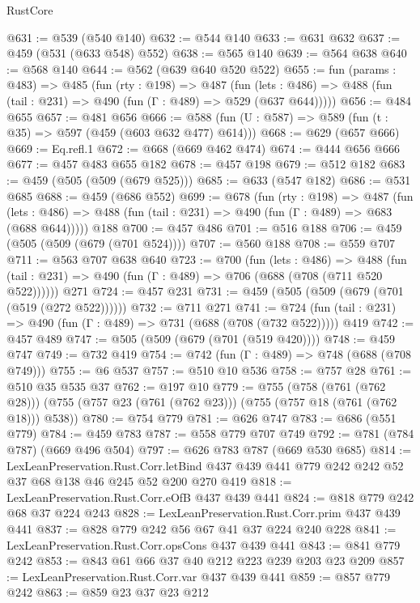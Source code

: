 \begin{lexlean}{RustCore}
\begin{coremodule}
@631 := @539 (@540 @140)
@632 := @544 @140
@633 := @631 @632
@637 := @459 (@531 (@633 @548) @552)
@638 := @565 @140
@639 := @564 @638
@640 := @568 @140
@644 := @562 (@639 @640 @520 @522)
@655 := fun (params : @483) =>
  @485
    (fun (rty : @198) =>
    @487
      (fun (lets : @486) => @488 (fun (tail : @231) => @490 (fun (Γ : @489) => @529 (@637 @644)))))
@656 := @484 @655
@657 := @481 @656
@666 := @588 (fun (U : @587) => @589 (fun (t : @35) => @597 (@459 (@603 @632 @477) @614)))
@668 := @629 (@657 @666)
@669 := Eq.refl.{1}
@672 := @668 (@669 @462 @474)
@674 := @444 @656 @666
@677 := @457 @483 @655 @182
@678 := @457 @198
@679 := @512 @182
@683 := @459 (@505 (@509 (@679 @525)))
@685 := @633 (@547 @182)
@686 := @531 @685
@688 := @459 (@686 @552)
@699 := @678
    (fun (rty : @198) =>
    @487
      (fun (lets : @486) => @488 (fun (tail : @231) => @490 (fun (Γ : @489) => @683 (@688 @644)))))
    @188
@700 := @457 @486
@701 := @516 @188
@706 := @459 (@505 (@509 (@679 (@701 @524))))
@707 := @560 @188
@708 := @559 @707
@711 := @563 @707 @638 @640
@723 := @700
    (fun (lets : @486) =>
    @488 (fun (tail : @231) => @490 (fun (Γ : @489) => @706 (@688 (@708 (@711 @520 @522))))))
    @271
@724 := @457 @231
@731 := @459 (@505 (@509 (@679 (@701 (@519 (@272 @522))))))
@732 := @711 @271
@741 := @724 (fun (tail : @231) => @490 (fun (Γ : @489) => @731 (@688 (@708 (@732 @522))))) @419
@742 := @457 @489
@747 := @505 (@509 (@679 (@701 (@519 @420))))
@748 := @459 @747
@749 := @732 @419
@754 := @742 (fun (Γ : @489) => @748 (@688 (@708 @749)))
@755 := @6 @537
@757 := @510 @10 @536
@758 := @757 @28
@761 := @510 @35 @535 @37
@762 := @197 @10
@779 := @755
    (@758 (@761 (@762 @28)))
    (@755 (@757 @23 (@761 (@762 @23))) (@755 (@757 @18 (@761 (@762 @18))) @538))
@780 := @754 @779
@781 := @626 @747
@783 := @686 (@551 @779)
@784 := @459 @783
@787 := @558 @779 @707 @749
@792 := @781 (@784 @787) (@669 @496 @504)
@797 := @626 @783 @787 (@669 @530 @685)
@814 := LexLeanPreservation.Rust.Corr.letBind
    @437
    @439
    @441
    @779
    @242
    @242
    @52
    @37
    @68
    @138
    @46
    @245
    @52
    @200
    @270
    @419
@818 := LexLeanPreservation.Rust.Corr.eOfB @437 @439 @441
@824 := @818 @779 @242 @68 @37 @224 @243
@828 := LexLeanPreservation.Rust.Corr.prim @437 @439 @441
@837 := @828 @779 @242 @56 @67 @41 @37 @224 @240 @228
@841 := LexLeanPreservation.Rust.Corr.opsCons @437 @439 @441
@843 := @841 @779 @242
@853 := @843 @61 @66 @37 @40 @212 @223 @239 @203 @23 @209
@857 := LexLeanPreservation.Rust.Corr.var @437 @439 @441
@859 := @857 @779 @242
@863 := @859 @23 @37 @23 @212

\end{coremodule}
\end{lexlean}
